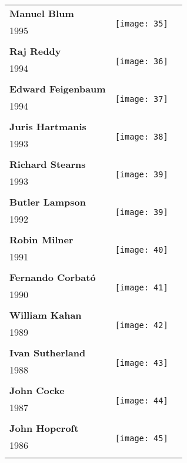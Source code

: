 \documentclass[12pt]{article}
\begin{document}
\begin{center}
\begin{longtable}{| p{} | p{} | p{20cm}}
&\\
\hline
\textbf{Manuel Blum } &  \multirow{3}{4em}{\texttt{[image: 35]}} \\ 
1995&   \\ 
&\\
\hline
\textbf{Raj Reddy } &  \multirow{3}{4em}{\texttt{[image: 36]}} \\ 
1994&   \\ 
&\\
\hline
\textbf{Edward Feigenbaum } &  \multirow{3}{4em}{\texttt{[image: 37]}} \\ 
1994&   \\ 
&\\
\hline
\textbf{Juris Hartmanis}  &  \multirow{3}{4em}{\texttt{[image: 38]}} \\ 
1993&   \\ 
&\\
\hline
\textbf{Richard Stearns}  &  \multirow{3}{4em}{\texttt{[image: 39]}} \\ 
1993&   \\ 
&\\
\hline
\textbf{Butler Lampson} &  \multirow{3}{4em}{\texttt{[image: 39]}} \\ 
1992&   \\ 
&\\
\hline
\textbf{Robin Milner}  &  \multirow{3}{4em}{\texttt{[image: 40]}} \\ 
1991&   \\ 
&\\
\hline
\textbf{Fernando Corbató}  &  \multirow{3}{4em}{\texttt{[image: 41]}} \\ 
1990&   \\ 
&\\
\hline
\textbf{William Kahan}  &  \multirow{3}{4em}{\texttt{[image: 42]}} \\ 
1989&   \\ 
&\\
\hline
\textbf{Ivan Sutherland}  &  \multirow{3}{4em}{\texttt{[image: 43]}} \\ 
1988&   \\ 
&\\
\hline
\textbf{John Cocke}  &  \multirow{3}{4em}{\texttt{[image: 44]}} \\ 
1987&   \\ 
&\\
\hline
\textbf{John Hopcroft}  &  \multirow{3}{4em}{\texttt{[image: 45]}} \\ 
1986&   \\ 
&\\

\end{longtable}
\end{center}
\end{document}
